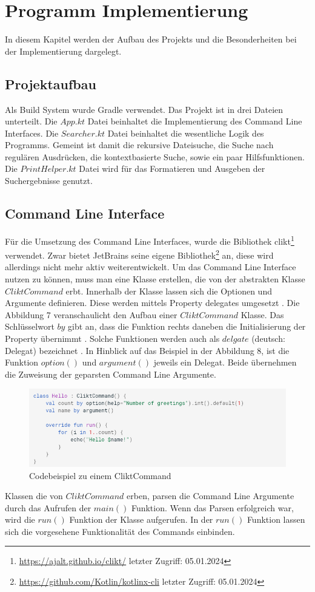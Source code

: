 \documentclass{article}
\begin{document}
\section{Programm Implementierung}
In diesem Kapitel werden der Aufbau des Projekts und die Besonderheiten bei der Implementierung dargelegt.
\subsection{Projektaufbau}
Als Build System wurde Gradle verwendet. Das Projekt ist in drei Dateien unterteilt. Die $App.kt$ Datei beinhaltet die Implementierung des Command Line Interfaces. Die $Searcher.kt$ Datei beinhaltet die wesentliche Logik des Programms. Gemeint ist damit die rekursive Dateisuche, die Suche nach regulären Ausdrücken, die kontextbasierte Suche, sowie ein paar Hilfsfunktionen. Die $PrintHelper.kt$ Datei wird für das Formatieren und Ausgeben der Suchergebnisse genutzt.
\subsection{Command Line Interface}
Für die Umsetzung des Command Line Interfaces, wurde die Bibliothek clikt\footnote{\url{https://ajalt.github.io/clikt/} letzter Zugriff: 05.01.2024} verwendet. Zwar bietet JetBrains seine eigene Bibliothek\footnote{\url{https://github.com/Kotlin/kotlinx-cli} letzter Zugriff: 05.01.2024} an, diese wird allerdings nicht mehr aktiv weiterentwickelt. Um das Command Line Interface nutzen zu können, muss man eine Klasse erstellen, die von der abstrakten Klasse $CliktCommand$ erbt. Innerhalb der Klasse lassen sich die Optionen und Argumente definieren. Diese werden mittels Property delegates umgesetzt \cite{clikt}. Die Abbildung 7 veranschaulicht den Aufbau einer $CliktCommand$ Klasse. Das Schlüsselwort $by$ gibt an, dass die Funktion rechts daneben die Initialisierung der Property übernimmt \cite{KotlinLangDoc}. Solche Funktionen werden auch als $delgate$ (deutsch: Delegat) bezeichnet \cite{KotlinLangDoc}.
\newline In Hinblick auf das Beispiel in der Abbildung 8, ist die Funktion $option()$ und $argument()$ jeweils ein Delegat. Beide übernehmen die Zuweisung der geparsten Command Line Argumente.
\begin{figure}[!htb]
    \centering
    \includegraphics[width=\linewidth]{img/CliktCommand.png}
    \caption{Codebeispiel zu einem CliktCommand\footnotemark}
\end{figure}
Klassen die von $CliktCommand$ erben, parsen die Command Line Argumente durch das Aufrufen der $main()$ Funktion. Wenn das Parsen erfolgreich war, wird die $run()$ Funktion der Klasse aufgerufen. In der $run()$ Funktion lassen sich die vorgesehene Funktionalität des Commands einbinden.
\end{document}
